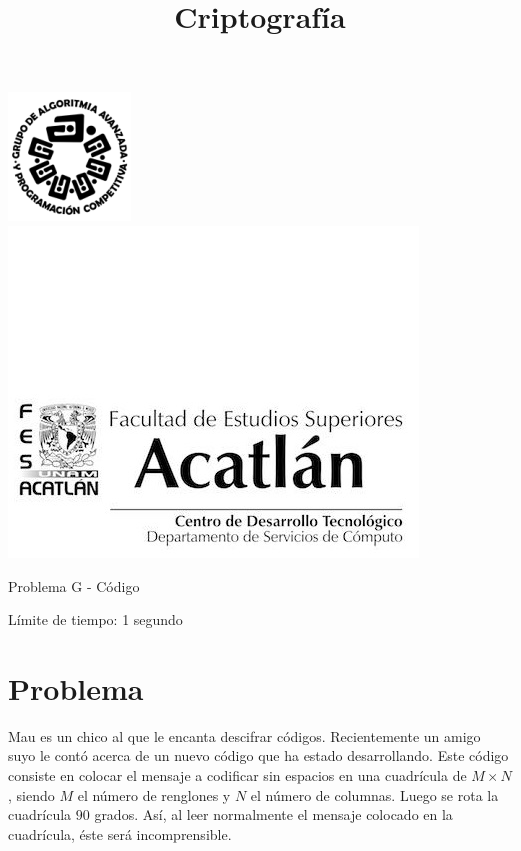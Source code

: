 \documentclass[letter,10pt]{article}
\date{}
\begin{document}
\title{Criptografía}

\includegraphics[scale=0.6]{logo} \hspace*{9.00cm}
\includegraphics[scale=0.5]{dsc} 
\bigskip
\begin{center}
    \Large Problema G - Código
\end{center}

\begin{flushright}
Límite de tiempo: 1 segundo
\par\end{flushright}
\bigskip

\section*{Problema}

Mau es un chico al que le encanta descifrar códigos. Recientemente un amigo suyo le contó acerca de un nuevo código que ha estado desarrollando. Este código consiste en colocar el mensaje a codificar sin espacios en una cuadrícula de $M\times N$, siendo $M$ el número de renglones y $N$ el número de columnas. Luego se rota la cuadrícula $90$ grados. Así, al leer normalmente el mensaje colocado en la cuadrícula, éste será incomprensible.

\end{document}
